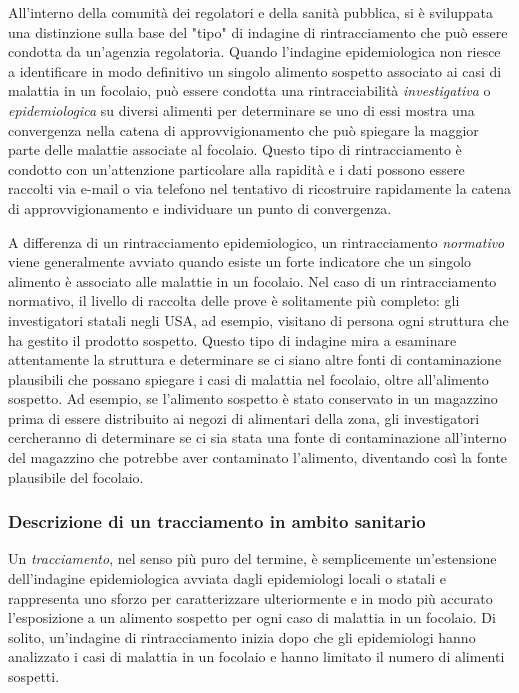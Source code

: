 All'interno della comunità dei regolatori e della sanità pubblica, si è sviluppata una distinzione sulla base del "tipo" di indagine di rintracciamento che può essere condotta da un'agenzia regolatoria. Quando l'indagine epidemiologica non riesce a identificare in modo definitivo un singolo alimento sospetto associato ai casi di malattia in un focolaio, può essere condotta una rintracciabilità \textit{investigativa} o \textit{epidemiologica} su diversi alimenti per determinare se uno di essi mostra una convergenza nella catena di approvvigionamento che può spiegare la maggior parte delle malattie associate al focolaio. Questo tipo di rintracciamento è condotto con un'attenzione particolare alla rapidità e i dati possono essere raccolti via e-mail o via telefono nel tentativo di ricostruire rapidamente la catena di approvvigionamento e individuare un punto di convergenza.

A differenza di un rintracciamento epidemiologico, un rintracciamento \textit{normativo} viene generalmente avviato quando esiste un forte indicatore che un singolo alimento è associato alle malattie in un focolaio. Nel caso di un rintracciamento normativo, il livello di raccolta delle prove è solitamente più completo: gli investigatori statali negli USA, ad esempio, visitano di persona ogni struttura che ha gestito il prodotto sospetto. Questo tipo di indagine mira a esaminare attentamente la struttura e determinare se ci siano altre fonti di contaminazione plausibili che possano spiegare i casi di malattia nel focolaio, oltre all'alimento sospetto. Ad esempio, se l'alimento sospetto è stato conservato in un magazzino prima di essere distribuito ai negozi di alimentari della zona, gli investigatori cercheranno di determinare se ci sia stata una fonte di contaminazione all'interno del magazzino che potrebbe aver contaminato l'alimento, diventando così la fonte plausibile del focolaio.

\subsubsection{Descrizione di un tracciamento in ambito sanitario}

Un \textit{tracciamento}, nel senso più puro del termine, è semplicemente un'estensione dell'indagine epidemiologica avviata dagli epidemiologi locali o statali e rappresenta uno sforzo per caratterizzare ulteriormente e in modo più accurato l'esposizione a un alimento sospetto per ogni caso di malattia in un focolaio. Di solito, un'indagine di rintracciamento inizia dopo che gli epidemiologi hanno analizzato i casi di malattia in un focolaio e hanno limitato il numero di alimenti sospetti.

